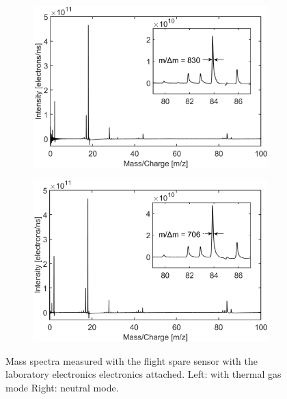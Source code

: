 		\begin{figure}[h]
			\begin{subfigure}{0.5\textwidth}
				\centering
				\includegraphics[width = \textwidth]{Experiments/FSLabthMode.png}
			\end{subfigure}
			\begin{subfigure}{0.5\textwidth}
				\centering
				\includegraphics[width = \textwidth]{Experiments/FSLabnMode.png}
			\end{subfigure}
			\caption{Mass spectra measured with the flight spare sensor with the laboratory electronics electronics attached. Left: with thermal gas mode Right: neutral mode.}
			\label{fig:ExpFSFlightSenMassRes}
		\end{figure}

